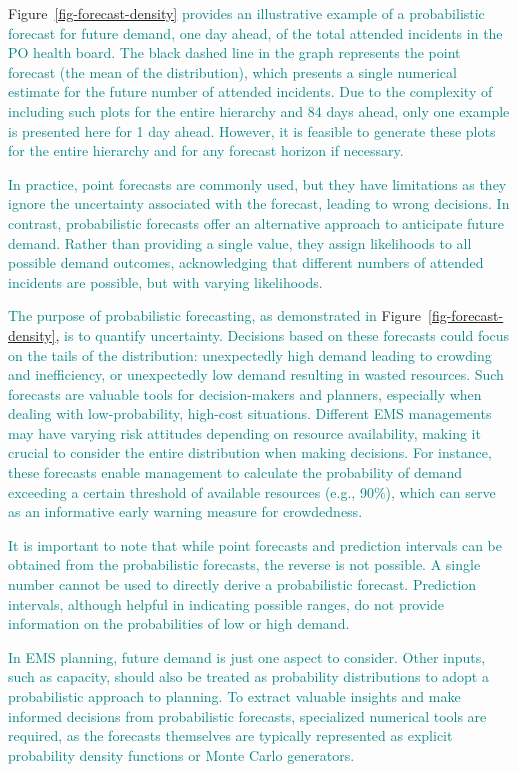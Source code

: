 \documentclass[
  authoryear,
  preprint,
  3p]{elsarticle}
\begin{document}
Figure~\ref{fig-forecast-density}
\textcolor{teal}{provides an illustrative example of a probabilistic forecast for future demand, one day ahead, of the total attended incidents in the PO health board. The black dashed line in the graph represents the point forecast (the mean of the distribution), which presents a single numerical estimate for the future number of attended incidents. Due to the complexity of including such plots for the entire hierarchy and 84 days ahead, only one example is presented here for 1 day ahead. However, it is feasible to generate these plots for the entire hierarchy and for any forecast horizon if necessary.}

\textcolor{teal}{In practice, point forecasts are commonly used, but they have limitations as they ignore the uncertainty associated with the forecast, leading to wrong decisions. In contrast, probabilistic forecasts offer an alternative approach to anticipate future demand. Rather than providing a single value, they assign likelihoods to all possible demand outcomes, acknowledging that different numbers of attended incidents are possible, but with varying likelihoods.}

\textcolor{teal}{The purpose of probabilistic forecasting, as demonstrated in}
Figure~\ref{fig-forecast-density},
\textcolor{teal}{is to quantify uncertainty. Decisions based on these forecasts could focus on the tails of the distribution: unexpectedly high demand leading to crowding and inefficiency, or unexpectedly low demand resulting in wasted resources. Such forecasts are valuable tools for decision-makers and planners, especially when dealing with low-probability, high-cost situations. Different EMS managements may have varying risk attitudes depending on resource availability, making it crucial to consider the entire distribution when making decisions. For instance, these forecasts enable management to calculate the probability of demand exceeding a certain threshold of available resources (e.g., 90\%), which can serve as an informative early warning measure for crowdedness.}

\textcolor{teal}{It is important to note that while point forecasts and prediction intervals can be obtained from the probabilistic forecasts, the reverse is not possible. A single number cannot be used to directly derive a probabilistic forecast. Prediction intervals, although helpful in indicating possible ranges, do not provide information on the probabilities of low or high demand.}

\textcolor{teal}{In EMS planning, future demand is just one aspect to consider. Other inputs, such as capacity, should also be treated as probability distributions to adopt a probabilistic approach to planning. To extract valuable insights and make informed decisions from probabilistic forecasts, specialized numerical tools are required, as the forecasts themselves are typically represented as explicit probability density functions or Monte Carlo generators.}
\end{document}
